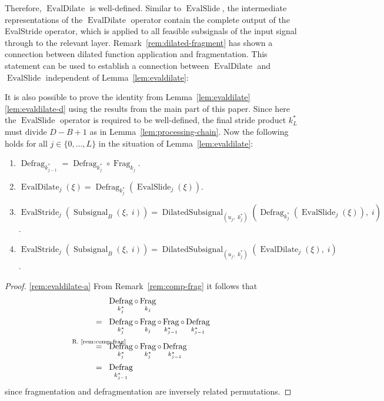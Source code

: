 \documentclass[journal]{IEEEtran}
\newcommand{\ROI}{B}
\newcommand{\discint}[2]{\{#1,\dotsc,#2\}}
\newcommand{\inint}[2]{\in\discint{#1}{#2}}
\DeclareMathOperator{\Subsignal}{Subsignal}
\DeclareMathOperator{\Fragmentation}{Frag}
\DeclareMathOperator{\Defragmentation}{Defrag}
\DeclareMathOperator{\EvalStride}{EvalStride}
\DeclareMathOperator{\EvalSlide}{EvalSlide}
\newcommand{\equsing}[1]{\overset{\mathclap{\text{#1}}}{=}}
\DeclareMathOperator{\DilatedSubsignal}{DilatedSubsignal}
\DeclareMathOperator{\EvalDilate}{EvalDilate}
\begin{document}
Therefore, $\EvalDilate$ is well-defined.
Similar to $\EvalSlide$, the intermediate representations of the $\EvalDilate$ operator contain the complete output of the EvalStride operator, which is applied to all feasible subsignals of the input signal through to the relevant layer.
Remark~\ref{rem:dilated-fragment} has shown a connection between dilated function application and fragmentation.
This statement can be used to establish a connection between $\EvalDilate$ and $\EvalSlide$ independent of Lemma~\ref{lem:evaldilate}:
\begin{remark}
\label{rem:evaldilate}
It is also possible to prove the identity from Lemma~\ref{lem:evaldilate}\ref{lem:evaldilate-d} using the results from the main part of this paper.
Since here the $\EvalSlide$ operator is required to be well-defined, the final stride product $k_L^*$ must divide $D - \ROI + 1$ as in Lemma~\ref{lem:processing-chain}.
Now the following holds for all $j\inint{0}{L}$ in the situation of Lemma~\ref{lem:evaldilate}:
\begin{enumerate}
  \item \label{rem:evaldilate-a} $\Defragmentation_{k_{j - 1}^*} = \Defragmentation_{k_j^*} \circ \Fragmentation_{k_j}$.
  \item \label{rem:evaldilate-b} $\EvalDilate_j(\xi) = \Defragmentation_{k_j^*}(\EvalSlide_j(\xi))$.
  \item \label{rem:evaldilate-c} $\EvalStride_j(\Subsignal_\ROI(\xi,\; i)) = \DilatedSubsignal_{(u_j,\; k_j^*)}(\Defragmentation_{k_j^*}(\EvalSlide_j(\xi)),\; i)$.
  \item \label{rem:evaldilate-d} $\EvalStride_j(\Subsignal_\ROI(\xi,\; i)) = \DilatedSubsignal_{(u_j,\; k_j^*)}(\EvalDilate_j(\xi),\; i)$.
\end{enumerate}
\end{remark}\begin{proof}
\ref{rem:evaldilate-a}
From Remark~\ref{rem:comp-frag} it follows that
\begin{align*}
  & \Defragmentation_{k_j^*} \circ \Fragmentation_{k_j}\\
  =\ \ & \Defragmentation_{k_j^*} \circ \Fragmentation_{k_j} \circ \Fragmentation_{k_{j - 1}^*} \circ \Defragmentation_{k_{j - 1}^*}\\
  \equsing{R.~\ref{rem:comp-frag}}\ \ & \Defragmentation_{k_j^*} \circ \Fragmentation_{k_j^*} \circ \Defragmentation_{k_{j - 1}^*}\\
  =\ \ & \Defragmentation_{k_{j - 1}^*}
\end{align*}
since fragmentation and defragmentation are inversely related permutations.


\end{proof}
\end{document}
